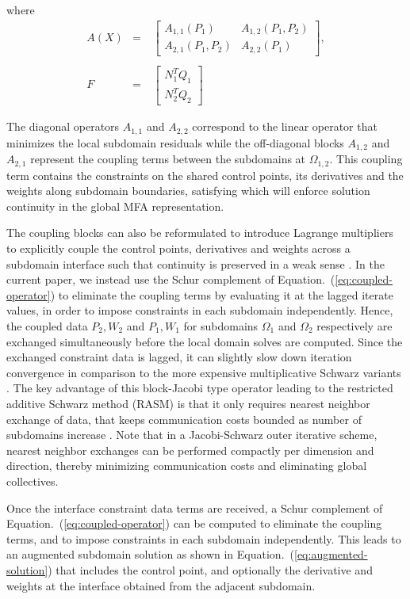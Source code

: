 \documentclass[conference]{IEEEtran}
\newcommand{\eqt}[1]{Equation.~(\ref{#1})}
\begin{document}
where
\begin{eqnarray}
A(X) &=&
\left[
\begin{array}{c|c}
A_{1,1}(P_1) & A_{1,2}(P_1,P_2) \\
\hline
A_{2,1}(P_1,P_2) & A_{2,2}(P_1)
\end{array}
\right], \\ 
&\quad& \nonumber \\
F &=& \left[
\begin{array}{c}
N_1^T Q_{1} \\
N_2^T Q_{2}
\end{array}
\right]
\label{eq:coupled-operator}
\end{eqnarray}

The diagonal operators $A_{1,1}$ and $A_{2,2}$ correspond to the linear operator that minimizes the local subdomain residuals while the off-diagonal blocks $A_{1,2}$ and $A_{2,1}$ represent the coupling terms between the subdomains at $\Omega_{1,2}$. This coupling term contains the constraints on the shared control points, its derivatives and the weights along subdomain boundaries, satisfying which will enforce solution continuity in the global MFA representation. 

The coupling blocks can also be reformulated to introduce Lagrange multipliers to explicitly couple the control points, derivatives and weights across a subdomain interface such that continuity is preserved in a weak sense \cite{nurbs-book}. In the current paper, we instead use the Schur complement of \eqt{eq:coupled-operator} to eliminate the coupling terms by evaluating it at the lagged iterate values, in order to impose constraints in each subdomain independently. Hence, the coupled data $P_2, W_2$ and $P_1, W_1$ for subdomains $\Omega_1$ and $\Omega_2$ respectively are exchanged simultaneously before the local domain solves are computed. Since the exchanged constraint data is lagged, it can slightly slow down iteration convergence in comparison to the more expensive multiplicative Schwarz variants \cite{smith-ddm}. The key advantage of this block-Jacobi type operator leading to the restricted additive Schwarz method (RASM) is that it only requires nearest neighbor exchange of data, that keeps communication costs bounded as number of subdomains increase \cite{gander-rasm}. Note that in a Jacobi-Schwarz outer iterative scheme, nearest neighbor exchanges can be performed compactly per dimension and direction, thereby minimizing communication costs and eliminating global collectives.

Once the interface constraint data terms are received, a Schur complement of \eqt{eq:coupled-operator} can be computed to eliminate the coupling terms, and to impose constraints in each subdomain independently. This leads to an augmented subdomain solution as shown in \eqt{eq:augmented-solution} that includes the control point, and optionally the derivative and weights at the interface obtained from the adjacent subdomain. 
\end{document}
